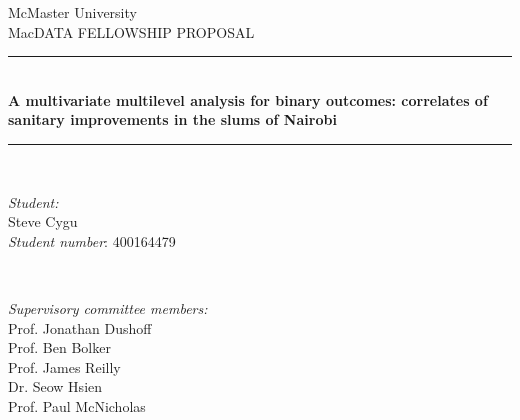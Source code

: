 \documentclass[12pt]{article}
\begin{document}
\begin{titlepage}

\newcommand{\HRule}{\rule{\linewidth}{0.5mm}} %

\center %


\LARGE McMaster University\\[1.5cm] %
\Large MacDATA FELLOWSHIP PROPOSAL\\[0.5cm] %


\HRule \\[0.4cm]
{ \Huge \bfseries A multivariate multilevel analysis for binary outcomes: correlates of sanitary improvements in the slums of Nairobi}\\[0.4cm] %
\HRule \\[1.5cm]



\begin{minipage}{0.3\textwidth}
\begin{flushleft} \large
\emph{Student:}\\
Steve Cygu\\
\emph{Student number}: 400164479 %
\end{flushleft}
\end{minipage}
~
\begin{minipage}{0.6\textwidth}
\begin{flushright} \large
\emph{Supervisory committee members:} \\
Prof. Jonathan Dushoff\\ %
Prof. Ben Bolker\\
Prof. James Reilly\\
Dr. Seow Hsien\\
Prof. Paul McNicholas
\end{flushright}
\end{minipage}\\[2cm]


\end{titlepage}
\end{document}
